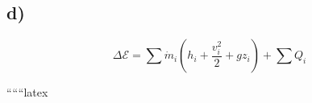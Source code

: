

\subsection*{d)}

\[
\Delta \mathcal{E} = \sum \dot{m}_i (h_i + \frac{v_i^2}{2} + gz_i) + \sum Q_i
\]

``````latex